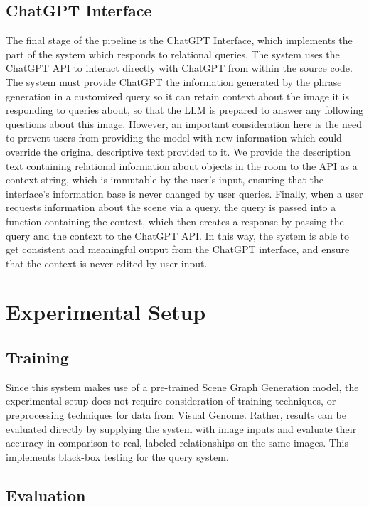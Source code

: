 \documentclass[letterpaper, 10 pt, conference]{ieeeconf}  %
\begin{document}
    \subsection*{ChatGPT Interface}
        The final stage of the pipeline is the ChatGPT Interface, which implements the part of the system which responds to relational queries. The system uses the ChatGPT API to interact directly with ChatGPT from within the source code. The system must provide ChatGPT the information generated by the phrase generation in a customized query so it can retain context about the image it is responding to queries about, so that the LLM is prepared to answer any following questions about this image. However, an important consideration here is the need to prevent users from providing the model with new information which could override the original descriptive text provided to it. We provide the description text containing relational information about objects in the room to the API as a context string, which is immutable by the user's input, ensuring that the interface's information base is never changed by user queries. Finally, when a user requests information about the scene via a query, the query is passed into a function containing the context, which then creates a response by passing the query and the context to the ChatGPT API. In this way, the system is able to get consistent and meaningful output from the ChatGPT interface, and ensure that the context is never edited by user input.


\section{Experimental Setup}
\subsection*{Training}
    Since this system makes use of a pre-trained Scene Graph Generation model, the experimental setup does not require consideration of training techniques, or preprocessing techniques for data from Visual Genome. Rather, results can be evaluated directly by supplying the system with image inputs and evaluate their accuracy in comparison to real, labeled relationships on the same images. This implements black-box testing for the query system.

\subsection*{Evaluation}
\end{document}
